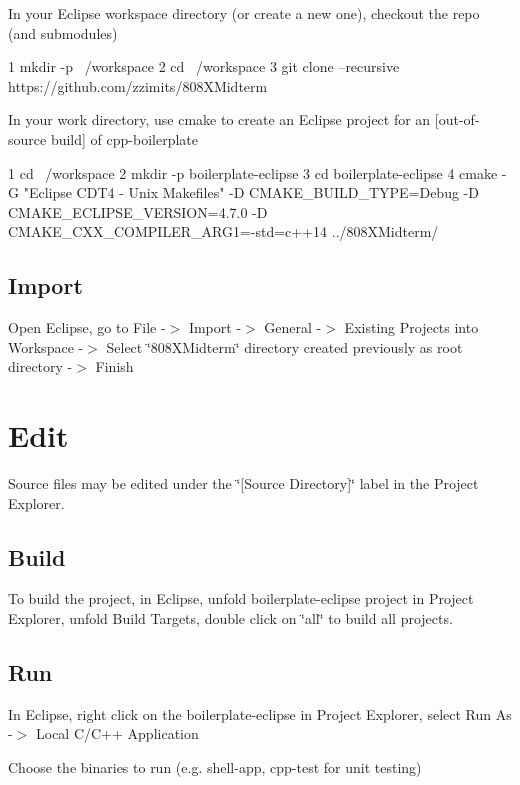 In your Eclipse workspace directory (or create a new one), checkout the repo (and submodules) 
\begin{DoxyCode}
1 mkdir -p ~/workspace
2 cd ~/workspace
3 git clone --recursive https://github.com/zzimits/808XMidterm
\end{DoxyCode}


In your work directory, use cmake to create an Eclipse project for an \mbox{[}out-\/of-\/source build\mbox{]} of cpp-\/boilerplate


\begin{DoxyCode}
1 cd ~/workspace
2 mkdir -p boilerplate-eclipse
3 cd boilerplate-eclipse
4 cmake -G "Eclipse CDT4 - Unix Makefiles" -D CMAKE\_BUILD\_TYPE=Debug -D CMAKE\_ECLIPSE\_VERSION=4.7.0 -D
       CMAKE\_CXX\_COMPILER\_ARG1=-std=c++14 ../808XMidterm/
\end{DoxyCode}


\subsection*{Import}

Open Eclipse, go to File -\/$>$ Import -\/$>$ General -\/$>$ Existing Projects into Workspace -\/$>$ Select \char`\"{}808\+X\+Midterm\char`\"{} directory created previously as root directory -\/$>$ Finish

\section*{Edit}

Source files may be edited under the \char`\"{}\mbox{[}\+Source Directory\mbox{]}\char`\"{} label in the Project Explorer.

\subsection*{Build}

To build the project, in Eclipse, unfold boilerplate-\/eclipse project in Project Explorer, unfold Build Targets, double click on \char`\"{}all\char`\"{} to build all projects.

\subsection*{Run}


\begin{DoxyEnumerate}
\item In Eclipse, right click on the boilerplate-\/eclipse in Project Explorer, select Run As -\/$>$ Local C/\+C++ Application
\item Choose the binaries to run (e.\+g. shell-\/app, cpp-\/test for unit testing)
\end{DoxyEnumerate}

